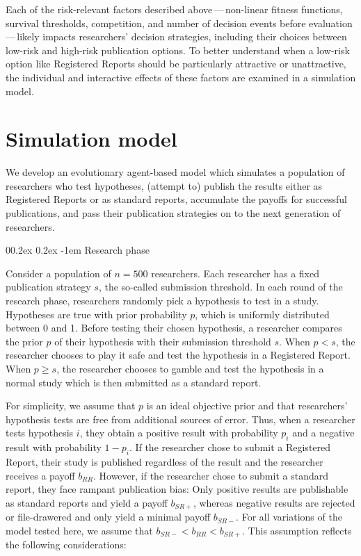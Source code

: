 \documentclass[british,,man,mask,floatsintext]{apa6}
\makeatletter
\renewcommand{\paragraph}{\@startsection{paragraph}{4}{\parindent}%
  {0\baselineskip \@plus 0.2ex \@minus 0.2ex}%
  {-1em}%
  {\normalfont\normalsize\bfseries\itshape\typesectitle}}
\makeatother
\begin{document}
Each of the risk-relevant factors described above\(\,\)---\(\,\)non-linear fitness functions, survival thresholds, competition, and number of decision events before evaluation\(\,\)---\(\,\)likely impacts researchers' decision strategies, including their choices between low-risk and high-risk publication options.
To better understand when a low-risk option like Registered Reports should be particularly attractive or unattractive, the individual and interactive effects of these factors are examined in a simulation model.

\hypertarget{simulation-model}{%
\section{Simulation model}\label{simulation-model}}

We develop an evolutionary agent-based model which simulates a population of researchers who test hypotheses, (attempt to) publish the results either as Registered Reports or as standard reports, accumulate the payoffs for successful publications, and pass their publication strategies on to the next generation of researchers.

\hypertarget{research-phase}{%
\paragraph{Research phase}\label{research-phase}}

Consider a population of \(n = 500\) researchers.
Each researcher has a fixed publication strategy \(s\), the so-called submission threshold.
In each round of the research phase, researchers randomly pick a hypothesis to test in a study.
Hypotheses are true with prior probability \(p\), which is uniformly distributed between 0 and 1.
Before testing their chosen hypothesis, a researcher compares the prior \(p\) of their hypothesis with their submission threshold \(s\).
When \(p < s\), the researcher chooses to play it safe and test the hypothesis in a Registered Report.
When \(p \geq s\), the researcher chooses to gamble and test the hypothesis in a normal study which is then submitted as a standard report.

For simplicity, we assume that \(p\) is an ideal objective prior and that researchers' hypothesis tests are free from additional sources of error.
Thus, when a researcher tests hypothesis \(i\), they obtain a positive result with probability \(p_i\) and a negative result with probability \(1-p_i\).
If the researcher chose to submit a Registered Report, their study is published regardless of the result and the researcher receives a payoff \(b_{RR}\).
However, if the researcher chose to submit a standard report, they face rampant publication bias:
Only positive results are publishable as standard reports and yield a payoff \(b_{SR+}\), whereas negative results are rejected or file-drawered and only yield a minimal payoff \(b_{SR-}\).
For all variations of the model tested here, we assume that \(b_{SR-} < b_{RR} < b_{SR+}\).
This assumption reflects the following considerations:
\end{document}
